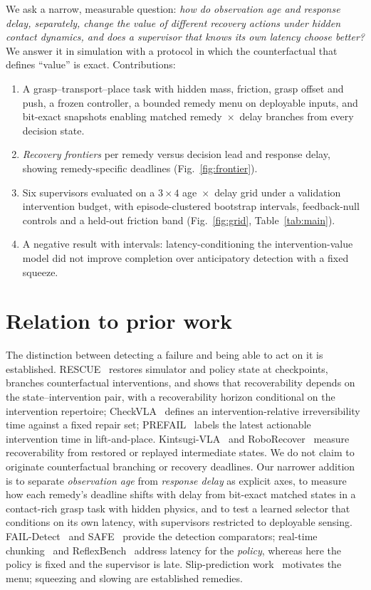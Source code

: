 \documentclass[conference]{IEEEtran}
\begin{document}
We ask a narrow, measurable question: \emph{how do observation age and response delay, separately, change the value of different recovery actions under hidden contact dynamics, and does a supervisor that knows its own latency choose better?} We answer it in simulation with a protocol in which the counterfactual that defines ``value'' is exact. Contributions:
\begin{enumerate}
\item A grasp--transport--place task with hidden mass, friction, grasp offset and push, a frozen controller, a bounded remedy menu on deployable inputs, and bit-exact snapshots enabling matched remedy~$\times$~delay branches from every decision state.
\item \emph{Recovery frontiers} per remedy versus decision lead and response delay, showing remedy-specific deadlines (Fig.~\ref{fig:frontier}).
\item Six supervisors evaluated on a $3\times4$ age~$\times$~delay grid under a validation intervention budget, with episode-clustered bootstrap intervals, feedback-null controls and a held-out friction band (Fig.~\ref{fig:grid}, Table~\ref{tab:main}).
\item A negative result with intervals: latency-conditioning the intervention-value model did not improve completion over anticipatory detection with a fixed squeeze.
\end{enumerate}

\section{Relation to prior work}
The distinction between detecting a failure and being able to act on it is established. RESCUE~\cite{rescue} restores simulator and policy state at checkpoints, branches counterfactual interventions, and shows that recoverability depends on the state--intervention pair, with a recoverability horizon conditional on the intervention repertoire; CheckVLA~\cite{checkvla} defines an intervention-relative irreversibility time against a fixed repair set; PREFAIL~\cite{prefail} labels the latest actionable intervention time in lift-and-place. Kintsugi-VLA~\cite{kintsugi} and RoboRecover~\cite{roborecover} measure recoverability from restored or replayed intermediate states. We do not claim to originate counterfactual branching or recovery deadlines. Our narrower addition is to separate \emph{observation age} from \emph{response delay} as explicit axes, to measure how each remedy's deadline shifts with delay from bit-exact matched states in a contact-rich grasp task with hidden physics, and to test a learned selector that conditions on its own latency, with supervisors restricted to deployable sensing. FAIL-Detect~\cite{faildetect} and SAFE~\cite{safe} provide the detection comparators; real-time chunking~\cite{rtc} and ReflexBench~\cite{reflex} address latency for the \emph{policy}, whereas here the policy is fixed and the supervisor is late. Slip-prediction work~\cite{slipbound} motivates the menu; squeezing and slowing are established remedies.
\end{document}
